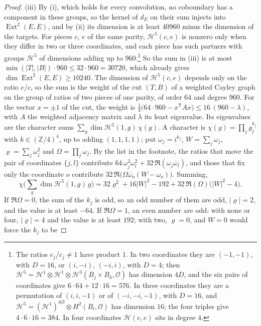 \documentclass[11pt,reqno]{amsart}
\theoremstyle{plain}
\theoremstyle{definition}
\theoremstyle{remark}
\newcommand{\ZZ}{\mathbb{Z}}
\newcommand{\cO}{\mathcal{O}}
\newcommand{\cH}{\mathcal{H}}
\DeclareMathOperator{\Ext}{Ext}
\newcommand{\bbar}[1]{\overline{#1}}
\begin{document}
\begin{proof}
(iii) By (i), which holds for every convolution, no
coboundary has a component in these groups, so the kernel of $d_{E}$ on
their sum injects into $\Ext^{2}(E,E)$, and by (ii) its dimension is at
least $40960$ minus the dimension of the targets. For pieces $c$, $e$ of the
same parity, $\cH^{5}(c,e)$ is nonzero only when they differ in two or three
coordinates, and each piece has such partners with groups $\cH^{5}$ of
dimensions adding up to $960$.\footnote{The ratios $e_{j}/c_{j}\ne1$ have
product $1$. In two coordinates they are $(-1,-1)$, with $D=16$, or
$(i,-i)$, $(-i,i)$, with $D=4$; then
$\cH^{5}=\cH^{1}\otimes\cH^{1}\otimes\cH^{3}(B_{j}\times B_{k},\cO)$ has
dimension $4D$, and the six pairs of coordinates give
$6\cdot64+12\cdot16=576$. In three coordinates they are a permutation of
$(i,i,-1)$ or of $(-i,-i,-1)$, with $D=16$, and
$\cH^{5}=(\cH^{1})^{\otimes3}\otimes H^{2}(B_{l},\cO)$ has dimension $16$;
the four triples give $4\cdot6\cdot16=384$. In four coordinates
$\cH(c,e)$ sits in degree $4$.}\enlargethispage{3pt} So the sum in (iii) is at most
$\min(|T|,|B|)\cdot960\le32\cdot960=30720$, which already gives
$\dim\Ext^{2}(E,E)\ge10240$. The dimension of $\cH^{5}(c,e)$ depends only on
the ratio $e/c$, so the sum is the weight of the cut $(T,B)$ of a weighted
Cayley graph on the group of ratios of two pieces of one parity, of order
$64$ and degree $960$. For the vector $x=\pm1$ of the cut, the weight is
$\tfrac14\bigl(64\cdot960-x^{\mathsf T}Ax\bigr)\le16\,(960-\lambda)$, with
$A$ the weighted adjacency matrix and $\lambda$ its least eigenvalue. Its
eigenvalues are the character sums $\sum_{g}\dim\cH^{5}(1,g)\,\chi(g)$. A
character is $\chi(g)=\prod_{j}g_{j}^{k_{j}}$ with $k\in(\ZZ/4)^{4}$, up to
adding $(1,1,1,1)$; put $\omega_{j}=i^{k_{j}}$, $W=\sum_{j}\omega_{j}$,
$\varrho=\sum_{j}\omega_{j}^{2}$ and $\Omega=\prod_{j}\omega_{j}$. By the
list in the footnote, the ratios that move the pair of coordinates
$\{j,l\}$ contribute $64\,\omega_{j}^{2}\omega_{l}^{2}
+32\,\Re(\omega_{j}\bbar\omega_{l})$, and those that fix only the
coordinate $o$ contribute $32\,\Re\bigl(\Omega\bbar\omega_{o}(W-\omega_{o})\bigr)$.
Summing,
\[
  \chi\bigl(\textstyle\sum_{g}\dim\cH^{5}(1,g)\,g\bigr)
  =32\varrho^{2}+16|W|^{2}-192+32\,\Re(\Omega)\bigl(|W|^{2}-4\bigr).
\]
If $\Re\Omega=0$, the sum of the $k_{j}$ is odd, so an odd number of them
are odd, $|\varrho|=2$, and the value is at least $-64$. If $\Re\Omega=1$,
an even number are odd: with none or four, $|\varrho|=4$ and the value is at
least $192$; with two, $\varrho=0$, and $W=0$ would force the $k_{j}$ to be

\end{proof}
\end{document}
